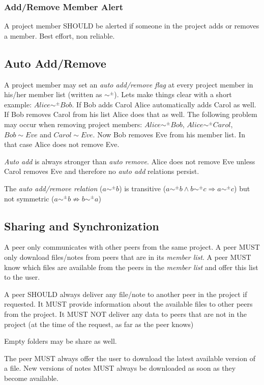\subsubsection{Add/Remove Member Alert}
A project member SHOULD be alerted if someone in the project adds or removes a member. Best effort, non reliable. 

\subsection{Auto Add/Remove}
A project member may set an \emph{auto add/remove flag} at every project member in his/her member list (written as $\sim ^\pm$). Lets make things clear with a short example: $Alice \sim ^\pm Bob$. If Bob adds Carol Alice automatically adds Carol as well. If Bob removes Carol from his list Alice does that as well. The following problem may occur when removing project members: $Alice \sim ^\pm Bob$, $Alice \sim ^\pm  Carol$, $Bob \sim Eve$ and $Carol \sim Eve$. Now Bob removes Eve from his member list. In that case Alice does not remove Eve. 

\emph{Auto add} is always stronger than \emph{auto remove}. Alice does not remove Eve unless Carol removes Eve and therefore no \emph{auto add} relations persist. 

The \emph{auto add/remove relation} ($a \sim ^\pm b$) is transitive ($a \sim ^\pm b \wedge b\sim ^\pm c \Rightarrow a \sim ^\pm c$) but not symmetric ($a \sim ^\pm b \not\Rightarrow b \sim ^\pm a$)

\subsection{Sharing and Synchronization}
A peer only communicates with other peers from the same project. A peer MUST only download files/notes from peers that are in its \emph{member list}. A peer MUST know which files are available from the peers in the \emph{member list} and offer this list to the user.

A peer SHOULD always deliver any file/note to another peer in the project if requested. It MUST provide information about the available files to other peers from the project. It MUST NOT deliver any data to peers that are not in the project (at the time of the request, as far as the peer knows)

Empty folders may be share as well.

The peer MUST always offer the user to download the latest available version of a file. New versions of notes MUST always be downloaded as soon as they become available.


